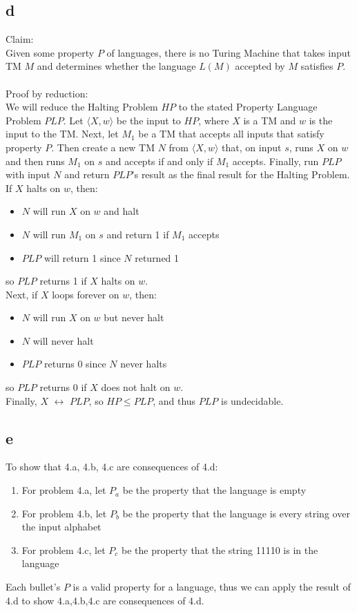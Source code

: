 \documentclass[letterpaper,notitlepage,twoside]{article}
\begin{document}
\subsection*{d}
Claim:\\
Given some property $P$ of languages, there is no Turing Machine that takes input TM $M$ and determines whether the language $L(M)$ accepted by $M$ satisfies $P$.\\\\
Proof by reduction:\\
We will reduce the Halting Problem $HP$ to the stated Property Language Problem $PLP$. Let $\langle X, w \rangle$ be the input to $HP$, where $X$ is a TM and $w$ is the input to the TM. Next, let $M_1$ be a TM that accepts all inputs that satisfy property $P$. Then create a new TM $N$ from $\langle X, w \rangle$ that, on input $s$, runs $X$ on $w$ and then runs $M_1$ on $s$ and accepts if and only if $M_1$ accepts. Finally, run $PLP$ with input $N$ and return $PLP$'s result as the final result for the Halting Problem.\\
If $X$ halts on $w$, then:
\begin{itemize}
\item $N$ will run $X$ on $w$ and halt
\item $N$ will run $M_1$ on $s$ and return 1 if $M_1$ accepts
\item $PLP$ will return 1 since $N$ returned 1
\end{itemize}
so $PLP$ returns 1 if $X$ halts on $w$.\\
Next, if $X$ loops forever on $w$, then:
\begin{itemize}
\item $N$ will run $X$ on $w$ but never halt
\item $N$ will never halt
\item $PLP$ returns 0 since $N$ never halts
\end{itemize}
so $PLP$ returns 0 if $X$ does not halt on $w$.\\
Finally, $X$ $\leftrightarrow$ $PLP$, so $HP \le PLP$, and thus $PLP$ is undecidable.

\subsection*{e}
To show that 4.a, 4.b, 4.c are consequences of 4.d:
\begin{enumerate}
\item For problem 4.a, let $P_a$ be the property that the language is empty
\item For problem 4.b, let $P_b$ be the property that the language is every string over the input alphabet
\item For problem 4.c, let $P_c$ be the property that the string 11110 is in the language
\end{enumerate}
Each bullet's $P$ is a valid property for a language, thus we can apply the result of 4.d to show 4.a,4.b,4.c are consequences of 4.d.
\end{document}

